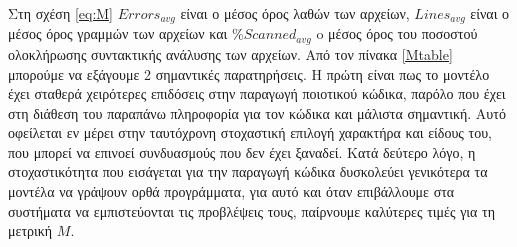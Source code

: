 Στη σχέση \ref{eq:M} $Errors_{avg}$ είναι ο μέσος όρος λαθών των αρχείων, $Lines_{avg}$ είναι ο μέσος όρος γραμμών των αρχείων και $\%Scanned_{avg}$ o μέσος όρος του ποσοστού ολοκλήρωσης συντακτικής ανάλυσης των αρχείων. Από τον πίνακα \ref{Mtable} μπορούμε να εξάγουμε 2 σημαντικές παρατηρήσεις.
Η πρώτη είναι πως το μοντέλο  έχει σταθερά χειρότερες επιδόσεις στην παραγωγή ποιοτικού κώδικα, παρόλο που έχει στη διάθεση του παραπάνω πληροφορία για τον κώδικα και μάλιστα σημαντική. Αυτό οφείλεται εν μέρει στην ταυτόχρονη στοχαστική επιλογή χαρακτήρα και είδους του, που μπορεί να επινοεί συνδυασμούς που δεν έχει ξαναδεί. Κατά δεύτερο λόγο, η στοχαστικότητα που εισάγεται για την παραγωγή κώδικα δυσκολεύει γενικότερα τα μοντέλα να γράψουν ορθά προγράμματα, για αυτό και όταν επιβάλλουμε στα συστήματα να εμπιστεύονται τις προβλέψεις τους, παίρνουμε καλύτερες τιμές για τη μετρική $M$.